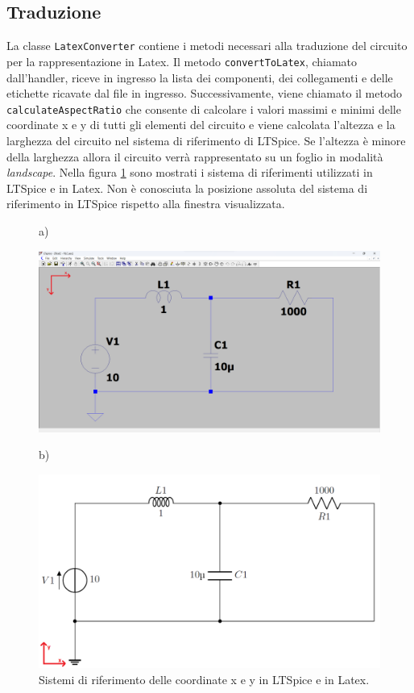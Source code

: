 \subsection{Traduzione}
La classe \texttt{LatexConverter} contiene i metodi necessari alla traduzione del circuito per la rappresentazione in Latex. Il metodo \texttt{convertToLatex}, chiamato dall'handler, riceve in ingresso la lista dei componenti, dei collegamenti e delle etichette ricavate dal file in ingresso. Successivamente, viene chiamato il metodo \texttt{calculateAspectRatio} che consente di calcolare i valori massimi e minimi delle coordinate x e y di tutti gli elementi del circuito e viene calcolata l'altezza e la larghezza del circuito nel sistema di riferimento di LTSpice. Se l'altezza è minore della larghezza allora il circuito verrà rappresentato su un foglio in modalità \textit{landscape}. Nella figura \ref{fig:sdr} sono mostrati i sistema di riferimenti utilizzati in LTSpice e in Latex. Non è conosciuta la posizione assoluta del sistema di riferimento in LTSpice rispetto alla finestra visualizzata.
\begin{figure}[h!]
	\centering
	a)
	\begin{minipage}{.460\textwidth}
		\includegraphics[width=\linewidth]{./ImageFiles/sdr-lt.png}
	\end{minipage}
	b)
	\begin{minipage}{.460\textwidth}
		\includegraphics[width=\linewidth]{./ImageFiles/sdr-latex.png}
	\end{minipage}
	\caption{Sistemi di riferimento delle coordinate x e y in LTSpice e in Latex.}
	\label{fig:sdr}
\end{figure}

